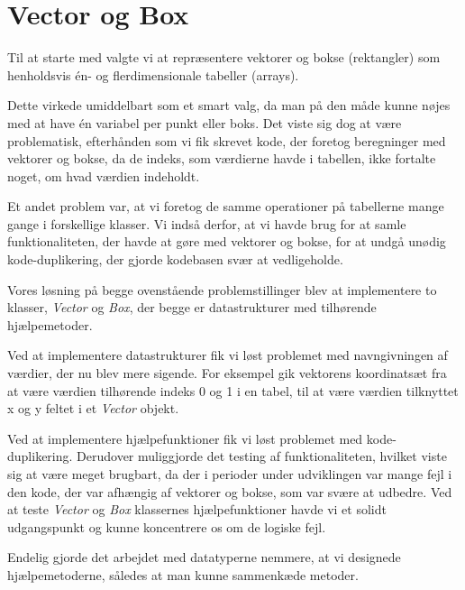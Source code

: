 \section{Vector og Box}

Til at starte med valgte vi at repræsentere vektorer og bokse (rektangler) som henholdsvis én- og flerdimensionale tabeller (arrays).

Dette virkede umiddelbart som et smart valg, da man på den måde kunne nøjes med at have én variabel per punkt eller boks. Det viste sig dog at være problematisk, efterhånden som vi fik skrevet kode, der foretog beregninger med vektorer og bokse, da de indeks, som værdierne havde i tabellen, ikke fortalte noget, om hvad værdien indeholdt.

Et andet problem var, at vi foretog de samme operationer på tabellerne mange gange i forskellige klasser. Vi indså derfor, at vi havde brug for at samle funktionaliteten, der havde at gøre med vektorer og bokse, for at undgå unødig kode-duplikering, der gjorde kodebasen svær at vedligeholde.

Vores løsning på begge ovenstående problemstillinger blev at implementere to klasser, \emph{Vector} og \emph{Box}, der begge er datastrukturer med tilhørende hjælpemetoder.

Ved at implementere datastrukturer fik vi løst problemet med navngivningen af værdier, der nu blev mere sigende. For eksempel gik vektorens koordinatsæt fra at være værdien tilhørende indeks 0 og 1 i en tabel, til at være værdien tilknyttet x og y feltet i et \emph{Vector} objekt.

Ved at implementere hjælpefunktioner fik vi løst problemet med kode-duplikering. Derudover muliggjorde det testing af funktionaliteten, hvilket viste sig at være meget brugbart, da der i perioder under udviklingen var mange fejl i den kode, der var afhængig af vektorer og bokse, som var svære at udbedre. Ved at teste \emph{Vector} og \emph{Box} klassernes hjælpefunktioner havde vi et solidt udgangspunkt og kunne koncentrere os om de logiske fejl.

Endelig gjorde det arbejdet med datatyperne nemmere, at vi designede hjælpemetoderne, således at man kunne sammenkæde metoder.